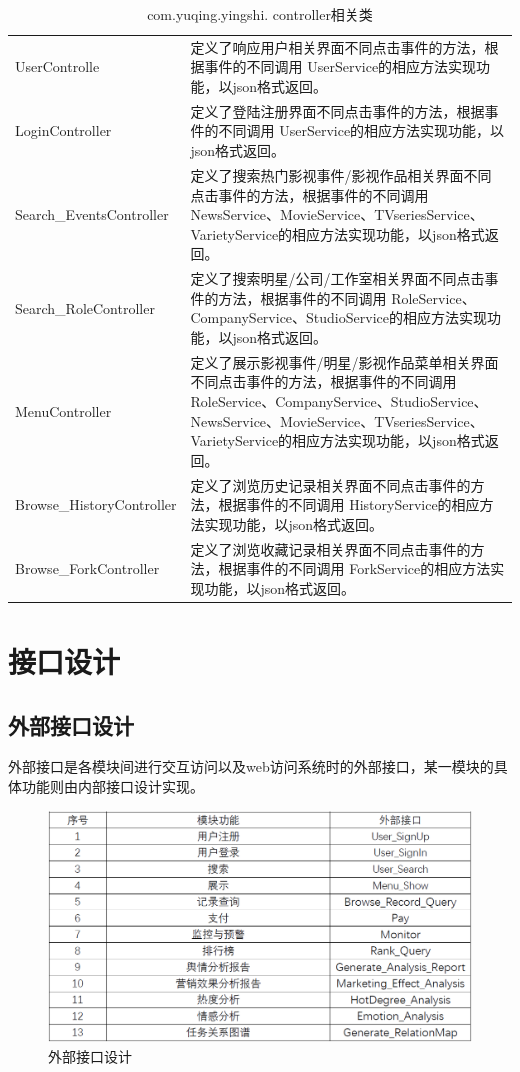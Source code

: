 \begin{table}
	\caption{com.yuqing.yingshi. controller相关类}
	\centering
	\begin{tabular}{|p{4.5cm}|p{8.5cm}|} 
		\hline 
		\rowcolor[HTML]{DAE8FC} 
		\multicolumn{2}{|c|}{com.yuqing.yingshi. controller相关类} \\ 
		\hline 
		UserControlle&定义了响应用户相关界面不同点击事件的方法，根据事件的不同调用 UserService的相应方法实现功能，以json格式返回。\\
		LoginController&定义了登陆注册界面不同点击事件的方法，根据事件的不同调用 UserService的相应方法实现功能，以json格式返回。\\
		Search\_EventsController&定义了搜索热门影视事件/影视作品相关界面不同点击事件的方法，根据事件的不同调用 NewsService、MovieService、TVseriesService、VarietyService的相应方法实现功能，以json格式返回。\\
		Search\_RoleController&定义了搜索明星/公司/工作室相关界面不同点击事件的方法，根据事件的不同调用 RoleService、CompanyService、StudioService的相应方法实现功能，以json格式返回。\\
		MenuController&定义了展示影视事件/明星/影视作品菜单相关界面不同点击事件的方法，根据事件的不同调用 RoleService、CompanyService、StudioService、NewsService、MovieService、TVseriesService、VarietyService的相应方法实现功能，以json格式返回。\\
		Browse\_HistoryController&定义了浏览历史记录相关界面不同点击事件的方法，根据事件的不同调用 HistoryService的相应方法实现功能，以json格式返回。\\
		Browse\_ForkController&定义了浏览收藏记录相关界面不同点击事件的方法，根据事件的不同调用 ForkService的相应方法实现功能，以json格式返回。\\
		\hline 
	\end{tabular}
\end{table}


\newpage
\section{接口设计}
\subsection{外部接口设计}
外部接口是各模块间进行交互访问以及web访问系统时的外部接口，某一模块的具体功能则由内部接口设计实现。
\begin{figure}[!htbp]
	\centering
	\includegraphics[scale=0.7]{image/m1.png}
	\caption{外部接口设计}
\end{figure}
